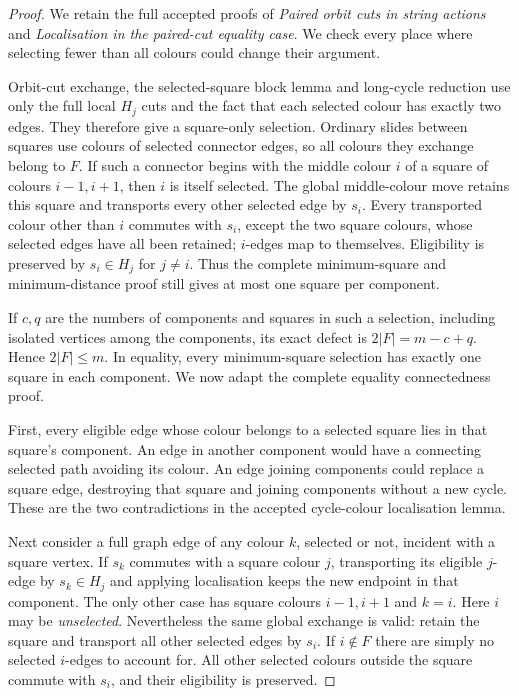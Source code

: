 \documentclass[11pt,a4paper]{article}
\begin{document}
\begin{proof}
We retain the full accepted proofs of \emph{Paired orbit cuts in
string actions} and \emph{Localisation in the paired-cut equality
case}. We check every place where selecting fewer than all colours
could change their argument.

Orbit-cut exchange, the selected-square block lemma and long-cycle
reduction use only the full local $H_j$ cuts and the fact that each
selected colour has exactly two edges. They therefore give a
square-only selection. Ordinary slides between squares use colours
of selected connector edges, so all colours they exchange belong
to $F$. If such a connector begins with the middle colour $i$ of
a square of colours $i-1,i+1$, then $i$ is itself selected. The
global middle-colour move retains this square and transports every
other selected edge by $s_i$. Every transported colour other than
$i$ commutes with $s_i$, except the two square colours, whose
selected edges have all been retained; $i$-edges map to themselves.
Eligibility is preserved by $s_i\in H_j$ for $j\ne i$.
Thus the complete minimum-square and minimum-distance proof still
gives at most one square per component.

If $c,q$ are the numbers of components and squares in such a
selection, including isolated vertices among the components, its
exact defect is $2|F|=m-c+q$. Hence $2|F|\leq m$. In equality,
every minimum-square selection has exactly one square in each
component. We now adapt the complete equality connectedness proof.

First, every eligible edge whose colour belongs to a selected square
lies in that square's component. An edge in another component
would have a connecting selected path avoiding its colour. An edge
joining components could replace a square edge, destroying that
square and joining components without a new cycle. These are the
two contradictions in the accepted cycle-colour localisation lemma.

Next consider a full graph edge of any colour $k$, selected or not,
incident with a square vertex. If $s_k$ commutes with a square colour
$j$, transporting its eligible $j$-edge by $s_k\in H_j$ and applying
localisation keeps the new endpoint in that component. The only
other case has square colours $i-1,i+1$ and $k=i$.
Here $i$ may be \emph{unselected}. Nevertheless the same global
exchange is valid: retain the square and transport all other selected
edges by $s_i$. If $i\notin F$ there are simply no selected
$i$-edges to account for. All other selected colours outside the
square commute with $s_i$, and their eligibility is preserved.


\end{proof}
\end{document}
